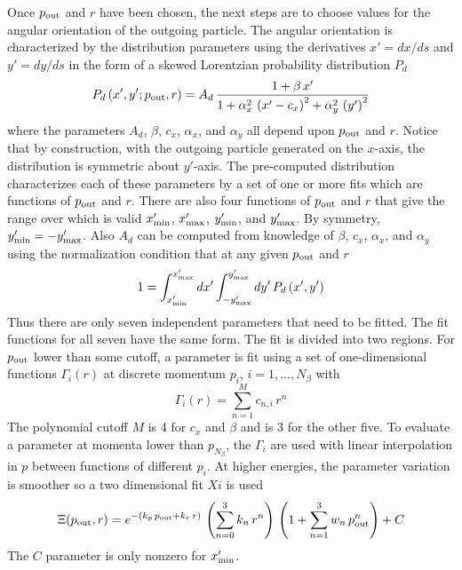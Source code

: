 Once $p_{\text{out}}$ and $r$ have been chosen, the next steps are to choose values for the angular
orientation of the outgoing particle. The angular orientation is characterized by the distribution
parameters using the derivatives $x' = dx/ds$ and $y' = dy/ds$ in the form of a skewed Lorentzian
probability distribution $P_d$
\begin{equation}
  P_d\left( x', y' ; p_{\text{out}}, r \right) =
  A_d \, \frac{1 + \beta \, x'}{1 + \alpha_x^2 \, \left( x' - c_x \right)^2 +
  \alpha_y^2 \, \left( y' \right)^2}
  \label{pxsxs}
\end{equation}
where the parameters $A_d$, $\beta$, $c_x$, $\alpha_x$, and $\alpha_y$ all depend upon $p_{\text{out}}$
and $r$. Notice that by construction, with the outgoing particle generated on the $x$-axis, the
distribution is symmetric about $y'$-axis. The pre-computed distribution characterizes each of these
parameters by a set of one or more fits which are functions of $p_{\text{out}}$ and $r$. There are also
four functions of $p_{\text{out}}$ and $r$ that give the range over which  is valid
$x'_{\text{min}}$, $x'_{\text{max}}$, $y'_{\text{min}}$, and $y'_{\text{max}}$. By symmetry, $y'_{\text{min}} =
-y'_{\text{max}}$. Also $A_d$ can be computed from knowledge of $\beta$, $c_x$, $\alpha_x$, and
$\alpha_y$ using the normalization condition that at any given $p_{\text{out}}$ and $r$
\begin{equation}
  1 = \int_{x'_{\text{min}}}^{x'_{\text{max}}} dx' 
  \int_{-y'_{\text{max}}}^{y'_{\text{max}}} dy' \, P_d \left( x', y' \right)
\end{equation}
Thus there are only seven independent parameters that need to be fitted. The fit functions for all
seven have the same form. The fit is divided into two regions. For $p_{\text{out}}$ lower than some
cutoff, a parameter is fit using a set of one-dimensional functions $\Gamma_i(r)$ at discrete momentum $p_i$,
$i = 1, \ldots, N_\beta$ with
\begin{equation}
  \Gamma_i(r) = \sum_{n=1}^M c_{n,i} \, r^n
  \label{gcr}
\end{equation}
The polynomial cutoff $M$ is 4 for $c_x$ and $\beta$ and is 3 for the other five.  To evaluate a
parameter at momenta lower than $p_{N_\beta}$, the $\Gamma_i$ are used with linear interpolation in
$p$ between functions of different $p_i$. At higher energies, the parameter variation is smoother so
a two dimensional fit $Xi$ is used
\begin{equation}
  \Xi(p_{\text{out}},r) = e^{-(k_p \, p_{\text{out}} + k_r \, r)} \,
  \left( \sum_{n=0}^3 k_{n} \, r^n \right) \, 
  \left( 1 + \sum_{n=1}^3 w_{n} \, p_{\text{out}}^n \right) + C
  \label{xkpkr}
\end{equation}
The $C$ parameter is only nonzero for $x'_{\text{min}}$. 

